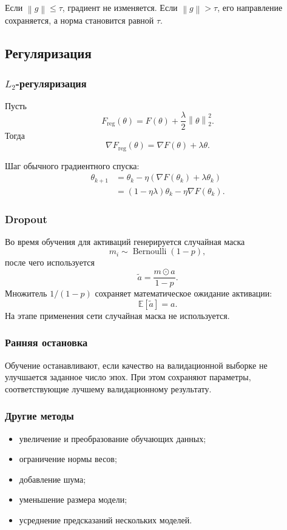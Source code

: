 \documentclass[12pt,a4paper]{article}
\theoremstyle{plain}
\theoremstyle{definition}
\theoremstyle{remark}
\newcommand{\E}{\mathbb{E}}
\newcommand{\norm}[1]{\left\lVert #1 \right\rVert}
\begin{document}
Если $\norm{g}\leq\tau$, градиент не изменяется. Если
$\norm{g}>\tau$, его направление сохраняется, а норма становится
равной $\tau$.

\subsection{Регуляризация}

\subsubsection{$L_2$-регуляризация}

Пусть
\[
    F_{\mathrm{reg}}(\theta)
    =
    F(\theta)
    +
    \frac{\lambda}{2}\norm{\theta}_2^2.
\]
Тогда
\[
    \nabla F_{\mathrm{reg}}(\theta)
    =
    \nabla F(\theta)+\lambda\theta.
\]

Шаг обычного градиентного спуска:
\[
\begin{aligned}
    \theta_{k+1}
    &=
    \theta_k
    -
    \eta
    \left(
        \nabla F(\theta_k)+\lambda\theta_k
    \right)\\
    &=
    (1-\eta\lambda)\theta_k
    -
    \eta\nabla F(\theta_k).
\end{aligned}
\]

\subsubsection{Dropout}

Во время обучения для активаций генерируется случайная маска
\[
    m_i\sim\operatorname{Bernoulli}(1-p),
\]
после чего используется
\[
    \widetilde{a}
    =
    \frac{m\odot a}{1-p}.
\]
Множитель $1/(1-p)$ сохраняет математическое ожидание активации:
\[
    \E[\widetilde{a}]=a.
\]
На этапе применения сети случайная маска не используется.

\subsubsection{Ранняя остановка}

Обучение останавливают, если качество на валидационной выборке не
улучшается заданное число эпох. При этом сохраняют параметры,
соответствующие лучшему валидационному результату.

\subsubsection{Другие методы}

\begin{itemize}
    \item увеличение и преобразование обучающих данных;
    \item ограничение нормы весов;
    \item добавление шума;
    \item уменьшение размера модели;
    \item усреднение предсказаний нескольких моделей.
\end{itemize}
\end{document}
